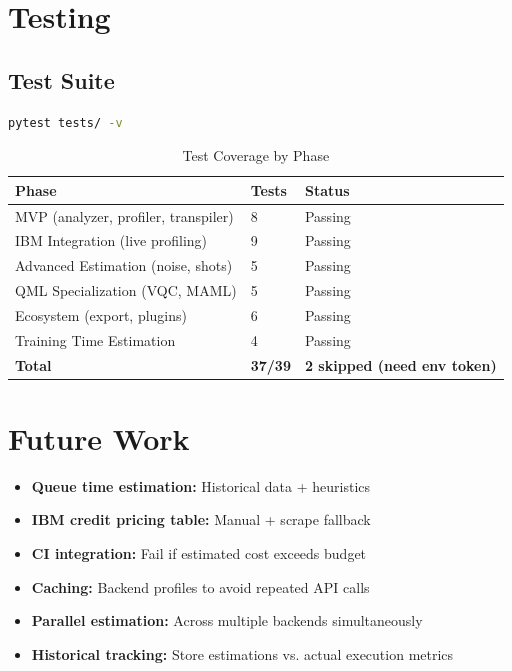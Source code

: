 \documentclass[11pt,a4paper]{article}
\begin{document}
\section{Testing}

\subsection{Test Suite}

\begin{lstlisting}[language=bash,caption=Running Tests]
pytest tests/ -v
\end{lstlisting}

\begin{table}[htbp]
\centering
\caption{Test Coverage by Phase}
\begin{tabular}{@{}lll@{}}
\toprule
\textbf{Phase} & \textbf{Tests} & \textbf{Status} \\
\midrule
MVP (analyzer, profiler, transpiler) & 8 & Passing \\
IBM Integration (live profiling) & 9 & Passing \\
Advanced Estimation (noise, shots) & 5 & Passing \\
QML Specialization (VQC, MAML) & 5 & Passing \\
Ecosystem (export, plugins) & 6 & Passing \\
Training Time Estimation & 4 & Passing \\
\midrule
\textbf{Total} & \textbf{37/39} & \textbf{2 skipped (need env token)} \\
\bottomrule
\end{tabular}
\end{table}

\section{Future Work}

\begin{itemize}[leftmargin=2em]
    \item \textbf{Queue time estimation:} Historical data + heuristics
    \item \textbf{IBM credit pricing table:} Manual + scrape fallback
    \item \textbf{CI integration:} Fail if estimated cost exceeds budget
    \item \textbf{Caching:} Backend profiles to avoid repeated API calls
    \item \textbf{Parallel estimation:} Across multiple backends simultaneously
    \item \textbf{Historical tracking:} Store estimations vs. actual execution metrics
\end{itemize}
\end{document}
